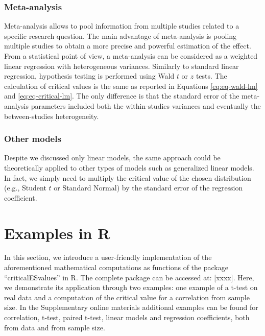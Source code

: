 \documentclass[
  man]{apa7}
\begin{document}
\hypertarget{meta-analysis}{%
\subsubsection{Meta-analysis}\label{meta-analysis}}

Meta-analysis allows to pool information from multiple studies related to a specific research question. The main advantage of meta-analysis is pooling multiple studies to obtain a more precise and powerful estimation of the effect. From a statistical point of view, a meta-analysis can be considered as a weighted linear regression with heterogeneous variances. Similarly to standard linear regression, hypothesis testing is performed using Wald \(t\) or \(z\) tests. The calculation of critical values is the same as reported in Equations \eqref{eq:eq-wald-lm} and \eqref{eq:eq-critical-lm}. The only difference is that the standard error of the meta-analysis parameters included both the within-studies variances and eventually the between-studies heterogeneity.

\hypertarget{other-models}{%
\subsubsection{Other models}\label{other-models}}

Despite we discussed only linear models, the same approach could be theoretically applied to other types of models such as generalized linear models. In fact, we simply need to multiply the critical value of the chosen distribution (e.g., Student \(t\) or Standard Normal) by the standard error of the regression coefficient.

\hypertarget{examples-in-r}{%
\section{Examples in R}\label{examples-in-r}}

In this section, we introduce a user-friendly implementation of the aforementioned mathematical computations as functions of the package ``criticalESvalues'' in R. The complete package can be accessed at: {[}xxxx{]}. Here, we demonstrate its application through two examples: one example of a t-test on real data and a computation of the critical value for a correlation from sample size. In the Supplementary online materials additional examples can be found for correlation, t-test, paired t-test, linear models and regression coefficients, both from data and from sample size.
\end{document}
